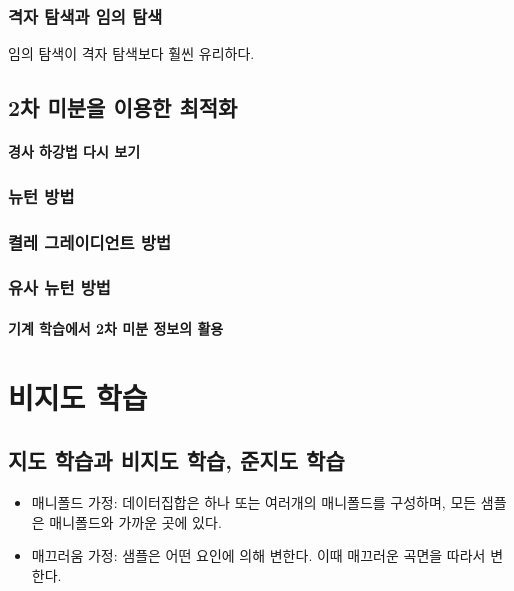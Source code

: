 \documentclass [12pt] {oblivoir}
\let\oldsubsubsection=\subsubsection
\renewcommand{\subsubsection}
{
  \filbreak
  \oldsubsubsection
}
\begin{document}
\subsubsection{격자 탐색과 임의 탐색}

임의 탐색이 격자 탐색보다 훨씬 유리하다.

\subsection{2차 미분을 이용한 최적화}

\paragraph*{경사 하강법 다시 보기}\mbox{}

\vspace{3mm}

\subsubsection{뉴턴 방법}

\subsubsection{켤레 그레이디언트 방법}

\subsubsection{유사 뉴턴 방법}

\paragraph*{기계 학습에서 2차 미분 정보의 활용}\mbox{}

\vspace{3mm}

\newpage
\section{비지도 학습}

\subsection{지도 학습과 비지도 학습, 준지도 학습}

\begin{itemize}
  \item 매니폴드 가정: 데이터집합은 하나 또는 여러개의 매니폴드를 구성하며, 모든 샘플은 매니폴드와 가까운 곳에 있다.
  \item 매끄러움 가정: 샘플은 어떤 요인에 의해 변한다. 이때 매끄러운 곡면을 따라서 변한다.
\end{itemize}
\end{document}
